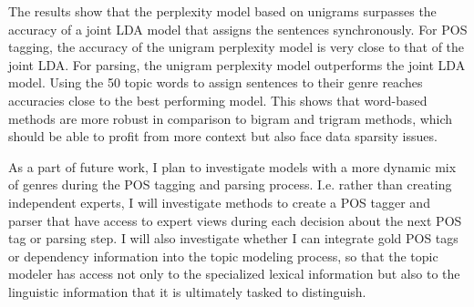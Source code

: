 The results show that the perplexity model  based on unigrams surpasses the accuracy of a joint LDA model that assigns the sentences synchronously.  For POS tagging, the  accuracy of the unigram perplexity model is very close to that of the joint LDA.  For parsing, the unigram perplexity model outperforms the joint LDA model.  Using the 50 topic words to assign sentences to their genre reaches accuracies close to the best performing model. This shows that word-based methods are more robust in comparison to bigram and trigram methods, which should be able to profit from more context but also face data sparsity issues.

As a part of future work, I plan to investigate models with a more dynamic mix of genres during the POS tagging and parsing process. I.e. rather than creating independent experts, I will investigate methods to create a POS tagger and parser that have access to expert views during each decision about the next POS tag or parsing step. I will also investigate whether I can integrate gold POS tags or dependency information into the topic modeling process, so that the topic modeler has access not only to the specialized lexical information but also to the linguistic information that it is ultimately tasked to distinguish. 
